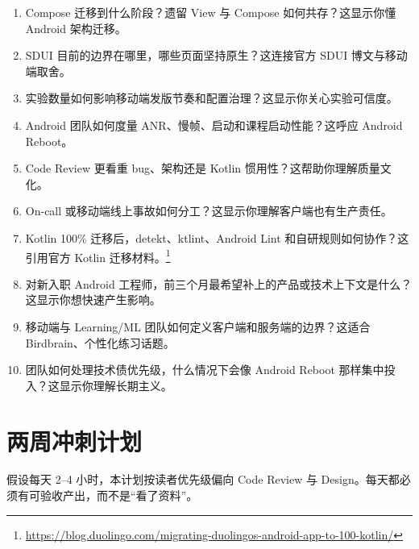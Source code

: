 \begin{enumerate}
  \item Compose 迁移到什么阶段？遗留 View 与 Compose 如何共存？这显示你懂 Android 架构迁移。
  \item SDUI 目前的边界在哪里，哪些页面坚持原生？这连接官方 SDUI 博文与移动端取舍。
  \item 实验数量如何影响移动端发版节奏和配置治理？这显示你关心实验可信度。
  \item Android 团队如何度量 ANR、慢帧、启动和课程启动性能？这呼应 Android Reboot。
  \item Code Review 更看重 bug、架构还是 Kotlin 惯用性？这帮助你理解质量文化。
  \item On-call 或移动端线上事故如何分工？这显示你理解客户端也有生产责任。
  \item Kotlin 100\% 迁移后，detekt、ktlint、Android Lint 和自研规则如何协作？这引用官方 Kotlin 迁移材料。\srcofficial\footnote{\url{https://blog.duolingo.com/migrating-duolingos-android-app-to-100-kotlin/}}
  \item 对新入职 Android 工程师，前三个月最希望补上的产品或技术上下文是什么？这显示你想快速产生影响。
  \item 移动端与 Learning/ML 团队如何定义客户端和服务端的边界？这适合 Birdbrain、个性化练习话题。
  \item 团队如何处理技术债优先级，什么情况下会像 Android Reboot 那样集中投入？这显示你理解长期主义。
\end{enumerate}

\section{两周冲刺计划}

假设每天 2--4 小时，本计划按读者优先级偏向 Code Review 与 Design。每天都必须有可验收产出，而不是“看了资料”。

